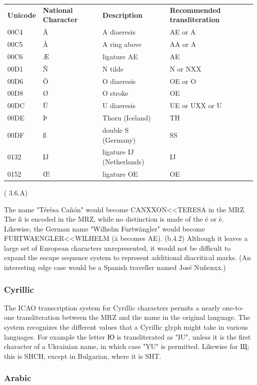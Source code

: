 \begin{tabular}{l|l|l|l}
\textbf{Unicode} & \textbf{National Character} & \textbf{Description} &
\textbf{Recommended transliteration} \\
00C4 & Ä & A diaeresis & AE or A \\
00C5 & Å & A ring above & AA or A \\
00C6 & Æ & ligature AE & AE \\
00D1 & Ñ & N tilde & N or NXX \\
00D6 & Ö & O diaeresis & OE or O \\
00D8 & Ø & O stroke & OE \\
00DC & Ü & U diaeresis & UE or UXX or U \\
00DE & Þ & Thorn (Iceland) & TH \\
00DF & ß & double S (Germany) & SS \\
0132 & Ĳ & ligature IJ (Netherlands) & IJ \\
0152 & Œ & ligature OE & OE \\
\end{tabular} (\parencite{ICAO9309} 3.6.A)

The name "Térèsa Cañón" would become CANXXON<<TERESA in the MRZ. The ñ is
encoded in the MRZ, while no distinction is made of the é or è. Likewise, the
German name "Wilhelm Furtwängler" would become FURTWAENGLER<<WILHELM (ä becomes
AE). (b.4.2) Although it leaves a large set of European characters
unrepresented, it would not be difficult to expand the escape sequence system to
represent additional diacritical marks. (An interesting edge case would be a
Spanish traveller named José Nuñenxx.)

\subsubsection{Cyrillic}

The ICAO transcription system for Cyrillic characters permits a nearly
one-to-one transliteration between the MRZ and the name in the original
language. The system recognizes the different values that a Cyrillic glyph might
take in various languages. For example the letter Ю is transliterated as "IU",
unless it is the first character of a Ukrainian name, in which case "YU" is
permitted. Likewise for Щ; this is SHCH, except in Bulgarian, where it is SHT.

\subsubsection{Arabic}

